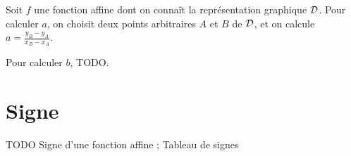 \begin{methode} Soit $f$ une fonction affine dont on connaît la représentation graphique $\cal D$.
  Pour calculer $a$, on choisit deux points arbitraires $A$ et $B$ de $\cal
  D$, et on calcule $a=\frac{y_B-y_A}{x_B-x_A}$.

  Pour calculer $b$, TODO.
\end{methode}

\section{Signe}

TODO Signe d'une fonction affine ; Tableau de signes
